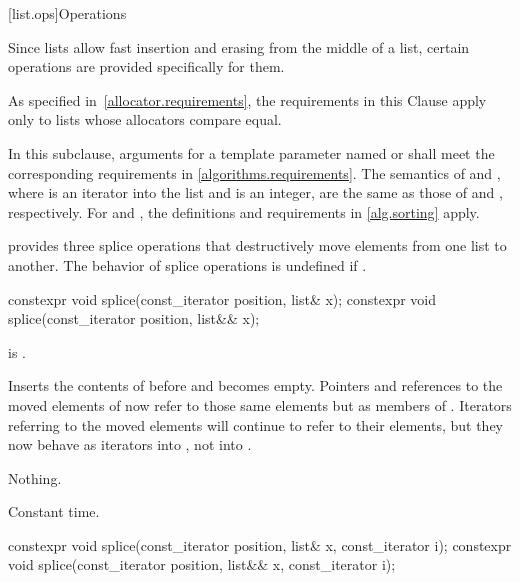 [list.ops]{Operations}

\pnum
Since lists allow fast insertion and erasing from the middle of a list, certain
operations are provided specifically for them.
\begin{footnote}
As specified
in~\ref{allocator.requirements}, the requirements in this Clause apply only to
lists whose allocators compare equal.
\end{footnote}
In this subclause,
arguments for a template parameter
named  or 
shall meet the corresponding requirements in \ref{algorithms.requirements}.
The semantics of  and ,
where  is an iterator into the list and  is an integer,
are the same as those of  and ,
respectively.
For  and ,
the definitions and requirements in \ref{alg.sorting} apply.

\pnum
{} provides three splice operations that destructively move elements from one list to
another. The behavior of splice operations is undefined if .

%
\begin{itemdecl}
constexpr void splice(const_iterator position, list& x);
constexpr void splice(const_iterator position, list&& x);
\end{itemdecl}

\begin{itemdescr}
\pnum
\expects
{} is .

\pnum
\effects
Inserts the contents of
before
and
becomes empty.
Pointers and references to the moved elements of
now refer to those same elements but as members of
.
Iterators referring to the moved elements will continue to refer to their
elements, but they now behave as iterators into
,
not into
.

\pnum
\throws
Nothing.

\pnum
\complexity
Constant time.
\end{itemdescr}

%
\begin{itemdecl}
constexpr void splice(const_iterator position, list& x, const_iterator i);
constexpr void splice(const_iterator position, list&& x, const_iterator i);
\end{itemdecl}

